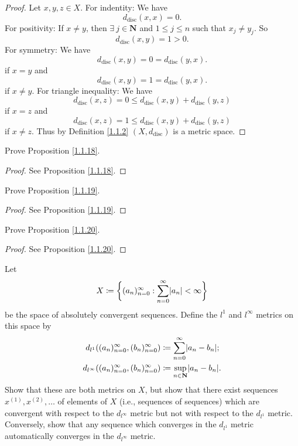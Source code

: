 \begin{proof}
    Let \(x, y, z \in X\).
    For indentity:
    We have
    \[
        d_{\text{disc}}(x, x) = 0.
    \]
    For positivity:
    If \(x \neq y\), then \(\exists\ j \in \mathbf{N}\) and \(1 \leq j \leq n\) such that \(x_j \neq y_j\).
    So
    \[
        d_{\text{disc}}(x, y) = 1 > 0.
    \]
    For symmetry:
    We have
    \[
        d_{\text{disc}}(x, y) = 0 = d_{\text{disc}}(y, x).
    \]
    if \(x = y\) and
    \[
        d_{\text{disc}}(x, y) = 1 = d_{\text{disc}}(y, x).
    \]
    if \(x \neq y\).
    For triangle inequality:
    We have
    \[
        d_{\text{disc}}(x, z) = 0 \leq d_{\text{disc}}(x, y) + d_{\text{disc}}(y, z)
    \]
    if \(x = z\) and
    \[
        d_{\text{disc}}(x, z) = 1 \leq d_{\text{disc}}(x, y) + d_{\text{disc}}(y, z)
    \]
    if \(x \neq z\).
    Thus by Definition \ref{1.1.2} \((X, d_{\text{disc}})\) is a metric space.
\end{proof}

\begin{exercise}\label{ex 1.1.12}
    Prove Proposition \ref{1.1.18}.
\end{exercise}

\begin{proof}
    See Proposition \ref{1.1.18}.
\end{proof}

\begin{exercise}\label{ex 1.1.13}
    Prove Proposition \ref{1.1.19}.
\end{exercise}

\begin{proof}
    See Proposition \ref{1.1.19}.
\end{proof}

\begin{exercise}\label{ex 1.1.14}
    Prove Proposition \ref{1.1.20}.
\end{exercise}

\begin{proof}
    See Proposition \ref{1.1.20}.
\end{proof}

\begin{exercise}\label{ex 1.1.15}
    Let
    \[
        X \coloneqq \bigg\{(a_n)_{n = 0}^\infty : \sum_{n = 0}^\infty \abs*{a_n} < \infty\bigg\}
    \]
    be the space of absolutely convergent sequences. Define the \(l^1\) and \(l^\infty\) metrics
    on this space by
    \begin{align*}
        d_{l^1}((a_n)_{n = 0}^\infty, (b_n)_{n = 0}^\infty)      & \coloneqq \sum_{n = 0}^\infty \abs*{a_n - b_n};     \\
        d_{l^\infty}((a_n)_{n = 0}^\infty, (b_n)_{n = 0}^\infty) & \coloneqq \sup_{n \in \mathbf{N}} \abs*{a_n - b_n}.
    \end{align*}
    Show that these are both metrics on \(X\), but show that there exist sequences \(x^{(1)}, x^{(2)}, \dots\) of elements of \(X\) (i.e., sequences of sequences) which are convergent with respect to the \(d_{l^\infty}\) metric but not with respect to the \(d_{l^1}\) metric.
    Conversely, show that any sequence which converges in the \(d_{l^1}\) metric automatically converges in the \(d_{l^\infty}\) metric.
\end{exercise}

